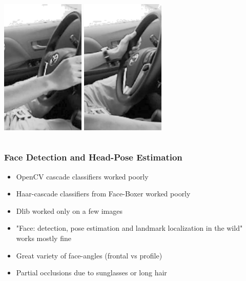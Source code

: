 \documentclass{beamer}
\begin{document}
\begin{frame}
\begin{columns}
\begin{column}{0.5\textwidth}
\begin{center}
     				\includegraphics[width=0.3\textwidth]{steering_wheel3}\hspace{0.1cm}
     				\includegraphics[width=0.3\textwidth]{steering_wheel4}
     				
     			\end{center}
     		\end{column}
     	\end{columns}
     	
     \end{frame}

	
	\begin{frame}
		\frametitle{Face Detection and Head-Pose Estimation}

		\begin{itemize}
		\item OpenCV cascade classifiers worked poorly
		\item Haar-cascade classifiers from Face-Boxer worked poorly
		\item Dlib worked only on a few images
		\item "Face: detection, pose estimation and landmark localization in the wild" works mostly fine
		\vspace{0.3cm}
		\item Great variety of face-angles (frontal vs profile)
		\item Partial occlusions due to sunglasses or long hair
		
		\end{itemize}
	\end{frame}
	
\end{document}
